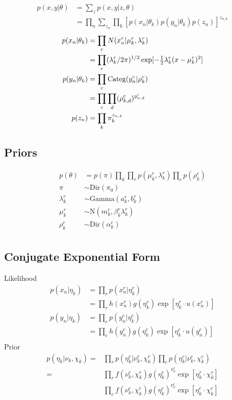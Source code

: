 \documentclass[a4paper,fleqn,10pt,openright,oldfontcommands]{memoir}
\begin{document}
\begin{align*}
	p(x, y | \theta) 
		&= \sum_z p(x, y | z, \theta) \\
	    &= \prod_n 
	       \sum_{z_n} 
	       \prod_k 
	       [ p(x_n | \theta_k) 
	         p(y_n | \theta_k) 
	         p(z_n) ]^{z_{n, k}}
\end{align*}
\begin{align*}
	p(x_n | \theta_k) 
		&= \prod_r N(x_n^r | \mu_k^r, \lambda_k^r) \\
		&= \prod_r (\lambda_k^r / 2 \pi)^{1/2} 
		           \exp [-\tfrac{1}{2} \lambda_k^r (x - \mu_k^r)^2 ] \\
%		
	p(y_n | \theta_k) 
		&= \prod_c {\rm Categ}(y_n^c | \rho_k^c) \\
		&= \prod_c \prod_d (\rho_{k,d}^{c})^{y_{n,d}^{c}} \\
%
	p(z_n) &= \prod_k \pi_k^{z_{n, k}}
\end{align*}

\subsection*{Priors}

 \begin{align*}
    p(\theta)
        &= p(\pi) \prod_k \prod_r p(\mu_k^r, \lambda_k^r) \prod_c p(\rho_k^c) \\
    \pi &\sim \mathrm{Dir}(\pi_0) \\
    \lambda^r_k 
      &\sim \mathrm{Gamma}(a^r_k, b^r_k) \\
    \mu^r_k 
      &\sim \mathrm{N}(m^r_k, \beta^r_k \lambda^r_k) \\
    \rho^c_k
      &\sim \mathrm{Dir}(\alpha^c_k) \\
\end{align*}


\subsection*{Conjugate Exponential Form}

Likelihood
\begin{align*}
	p(x_n | \eta_k) 
		&= \prod_r p(x_n^r | \eta_k^r) \\
		&= \prod_r h(x_n^r) g(\eta_k^r) \exp[ \eta_k^r \cdot u(x_n^r) ] \\
%
    p(y_n | \eta_k) 
		&= \prod_c p(y_n^c | \eta_k^c) \\
		&= \prod_c h(y_n^c) g(\eta_k^c) \exp[ \eta_k^c \cdot u(y_n^c) ] \\
\end{align*}
Prior
\begin{align*}
    p(\eta_k | \nu_k, \chi_k) 
        =& \prod_r p(\eta_k^r | \nu_k^r, \chi_k^r) 
           \prod_c p(\eta_k^c | \nu_k^c, \chi_k^c) \\
%
        =& \prod_r f(\nu_k^r, \chi_k^r) g(\eta_k^r)^{\nu_k^r} \exp[ \eta_k^r \cdot \chi_k^r ] \\
         & \prod_c f(\nu_k^c, \chi_k^c) g(\eta_k^c)^{\nu_k^c} \exp[ \eta_k^c \cdot \chi_k^c ]
\end{align*}
\end{document}
